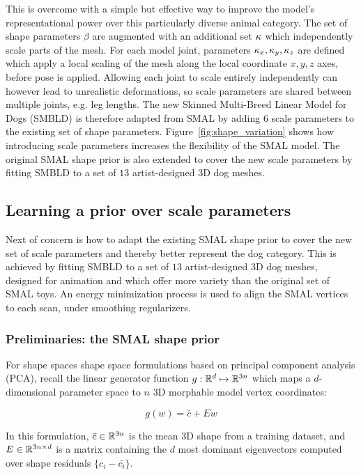 This is overcome with a simple but effective way to improve the model's representational power over this particularly diverse animal category. The set of shape parameters $\beta$ are augmented with an additional set $\kappa$ which independently scale parts of the mesh. For each model joint, parameters ${\kappa_x,\kappa_y,\kappa_z}$ are defined which apply a local scaling of the mesh along the local coordinate $x, y, z$ axes, before pose is applied. Allowing each joint to scale entirely independently can however lead to unrealistic deformations, so scale parameters are shared between multiple joints, e.g. leg lengths. The new Skinned Multi-Breed Linear Model for Dogs (SMBLD) is therefore adapted from SMAL by adding $6$ scale parameters to the existing set of shape parameters. Figure~\ref{fig:shape_variation} shows how introducing scale parameters increases the flexibility of the SMAL model. The original SMAL shape prior is also extended to cover the new scale parameters by fitting SMBLD to a set of $13$ artist-designed 3D dog meshes. 



\subsection{Learning a prior over scale parameters}

Next of concern is how to adapt the existing SMAL shape prior to cover the new set of scale parameters and thereby better represent the dog category. This is achieved by fitting SMBLD to a set of $13$ artist-designed 3D dog meshes, designed for animation and which offer more variety than the original set of SMAL toys. An energy minimization process is used to align the SMAL vertices to each scan, under smoothing regularizers. 

\subsubsection{Preliminaries: the SMAL shape prior}
For shape spaces shape space formulations based on principal component analysis (PCA), recall the linear generator function $g: {\mathbb{R}^{d}} \mapsto {\mathbb{R}^{3n}}$ which maps a $d$-dimensional parameter space to $n$ 3D morphable model vertex coordinates: 

\begin{equation}
    g(w) = \bar{c} + Ew
\end{equation}

In this formulation, $\bar{c} \in {\mathbb{R}^{3n}}$ is the mean 3D shape from a training dataset, and $E \in {\mathbb{R}^{3n \times d}}$ is a matrix containing the $d$ most dominant eigenvectors computed over shape residuals $\{c_i - \bar{c_i}\}$. 

